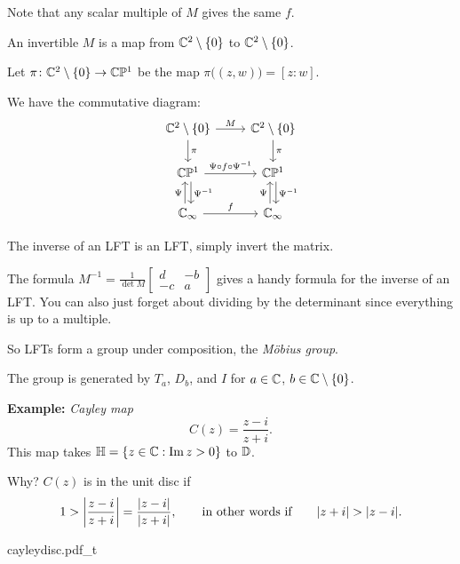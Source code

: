 \documentclass[10pt,aspectratio=169]{beamer}
\begin{document}
\begin{frame}[fragile]
Note that any scalar multiple of $M$ gives the same $f$.

\medskip
\pause

An invertible $M$ is a map from
${\mathbb{C}}^2 \setminus \{ 0 \}$ to ${\mathbb{C}}^2 \setminus \{ 0 \}$.

\pause
\medskip

Let $\pi \colon {\mathbb{C}}^2 \setminus \{ 0 \} \to {\mathbb{C}} {\mathbb{P}}^1$ be the map
$\pi \bigl( (z,w) \bigr) =
[z:w]$. 

\medskip
\pause

We have the commutative diagram:
\begin{equation*}
\begin{tikzcd}
\C^2 \setminus \{ 0 \} \arrow[r,"M"] \arrow[d,"\pi"] &
\C^2 \setminus \{ 0 \} \arrow[d,"\pi"] \\
\C \bP^1 \arrow[r,"\Psi \circ f \circ \Psi^{-1}"] \arrow[d,shift left,"\Psi^{-1}"] &
\C \bP^1 \arrow[d,shift left,"\Psi^{-1}"]
\\
\C_\infty \arrow[r,"f"]\arrow[u,shift left,"\Psi"] &
\C_\infty \arrow[u,shift left,"\Psi"]
\end{tikzcd}
\end{equation*}

\end{frame}

\begin{frame}
The inverse of an LFT is an LFT, simply invert the matrix.

\medskip
\pause

The formula $M^{-1} = \frac{1}{\det M}
\left[ \begin{smallmatrix} 
d & -b \\ -c & a
\end{smallmatrix} \right]$
gives a handy formula for the inverse
of an LFT.  You can also just forget about dividing by the determinant
since everything is up to a multiple.

\medskip
\pause

So LFTs form a group under composition,
the \emph{M\"obius group}.

\medskip
\pause

The group is generated by 
$T_a$, $D_b$, and $I$ for $a\in {\mathbb{C}}$, $b \in {\mathbb{C}} \setminus \{ 0 \}$.
\end{frame}

\begin{frame}
\textbf{Example:}
\emph{Cayley map}
\begin{equation*}
C(z)
=
\frac{z - i}{z + i} .
\end{equation*}
\pause
This map takes ${\mathbb{H}} = \{ z \in {\mathbb{C}} : \operatorname{Im} z > 0 \}$ to ${\mathbb{D}}$.

\medskip
\pause

Why?  $C(z)$ is in the unit disc if
\begin{equation*}
1 > \left\lvert {\frac{z - i}{z + i} } \right\rvert
=
\frac{\lvert {z - i} \rvert}{\lvert {z + i} \rvert} ,
\qquad \text{in other words if} \qquad
\lvert {z+i} \rvert > \lvert {z - i} \rvert .
\end{equation*}

\pause

\begin{center}
{cayleydisc.pdf_t}
\end{center}
\end{frame}
\end{document}
